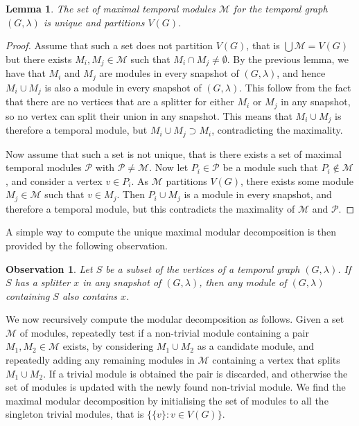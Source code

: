 \documentclass[preprint,12pt]{elsarticle}
\newtheorem{lemma}{Lemma}
\newtheorem{observation}{Observation}
\begin{document}
\begin{lemma}
    The set of maximal temporal modules $\mathcal{M}$ for the temporal graph $(G, \lambda)$ is unique and partitions $V(G)$.
\end{lemma}
\begin{proof}
    Assume that such a set does not partition $V(G)$, that is $\bigcup \mathcal{M} = V(G)$ but there exists $M_i, M_j \in \mathcal{M}$ such that $M_i \cap M_j \neq \emptyset$. By the previous lemma, we have that $M_i$ and $M_j$ are modules in every snapshot of $(G, \lambda)$, and hence $M_i \cup M_j$ is also a module in every snapshot of $(G, \lambda)$. This follow from the fact that there are no vertices that are a splitter for either $M_i$ or $M_j$ in any snapshot, so no vertex can split their union in any snapshot. This means that $M_i \cup M_j$ is therefore a temporal module, but $M_i \cup M_j \supset M_i$, contradicting the maximality.

    Now assume that such a set is not unique, that is there exists a set of maximal temporal modules $\mathcal{P}$ with $\mathcal{P} \neq \mathcal{M}$. Now let $P_i \in \mathcal{P}$ be a module such that $P_i \notin \mathcal{M}$, and consider a vertex $v \in P_i$. As $\mathcal{M}$ partitions $V(G)$, there exists some module $M_j \in \mathcal{M}$ such that $v \in M_j$. Then $P_i \cup M_j$ is a module in every snapshot, and therefore a temporal module, but this contradicts the maximality of $\mathcal{M}$ and $\mathcal{P}$.
\end{proof}

A simple way to compute the unique maximal modular decomposition is then provided by the following observation.

\begin{observation}
    Let $S$ be a subset of the vertices of a temporal graph $(G, \lambda)$. If $S$ has a splitter $x$ in any snapshot of $(G, \lambda)$, then any module of $(G, \lambda)$ containing $S$ also contains $x$.
\end{observation}

We now recursively compute the modular decomposition as follows. Given a set $\mathcal{M}$ of modules, repeatedly test if a non-trivial module containing a pair $M_1, M_2 \in \mathcal{M}$ exists, by considering $M_1 \cup M_2$ as a candidate module, and repeatedly adding any remaining modules in $\mathcal{M}$ containing a vertex that splits $M_1 \cup M_2$. If a trivial module is obtained the pair is discarded, and otherwise the set of modules is updated with the newly found non-trivial module. We find the maximal modular decomposition by initialising the set of modules to all the singleton trivial modules, that is $\{ \{v\} : v \in V(G) \}$.
\end{document}
